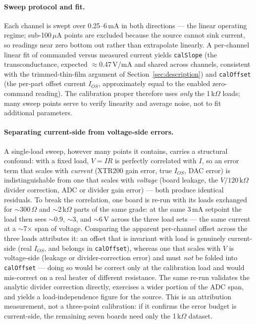 \documentclass[11pt]{article}
\begin{document}
\paragraph{Sweep protocol and fit.}
Each channel is swept over 0.25--6\,mA in both directions --- the linear
operating regime; sub-100\,$\mu$A points are excluded because the source
cannot sink current, so readings near zero bottom out rather than extrapolate
linearly. A per-channel linear fit of commanded versus measured current yields
\texttt{calSlope} (the transconductance, expected $\approx$0.47\,V/mA and
shared across channels, consistent with the trimmed-thin-film argument of
Section~\ref{sec:description}) and \texttt{calOffset} (the per-part offset
current $I_{OS}$, approximately equal to the enabled zero-command reading).
The calibration proper therefore uses \emph{only} the 1\,k$\Omega$ loads; many
sweep points serve to verify linearity and average noise, not to fit
additional parameters.

\paragraph{Separating current-side from voltage-side errors.}
A single-load sweep, however many points it contains, carries a structural
confound: with a fixed load, $V = IR$ is perfectly correlated with $I$, so an
error term that scales with \emph{current} (XTR200 gain error, true $I_{OS}$,
DAC error) is indistinguishable from one that scales with \emph{voltage}
(board leakage, the $V/120\,\text{k}\Omega$ divider correction, ADC or divider
gain error) --- both produce identical residuals. To break the correlation,
one board is re-run with its loads exchanged for $\sim$300\,$\Omega$ and
$\sim$2\,k$\Omega$ parts of the same grade: at the same 3\,mA setpoint the
load then sees $\sim$0.9, $\sim$3, and $\sim$6\,V across the three load sets
--- the same current at a $\sim$7$\times$ span of voltage. Comparing the
apparent per-channel offset across the three loads attributes it: an offset
that is invariant with load is genuinely current-side (real $I_{OS}$, and
belongs in \texttt{calOffset}), whereas one that scales with $V$ is
voltage-side (leakage or divider-correction error) and must \emph{not} be
folded into \texttt{calOffset} --- doing so would be correct only at the
calibration load and would mis-correct on a real heater of different
resistance. The same re-run validates the analytic divider correction
directly, exercises a wider portion of the ADC span, and yields a
load-independence figure for the source. This is an attribution measurement,
not a three-point calibration: if it confirms the error budget is
current-side, the remaining seven boards need only the 1\,k$\Omega$ dataset.
\end{document}
